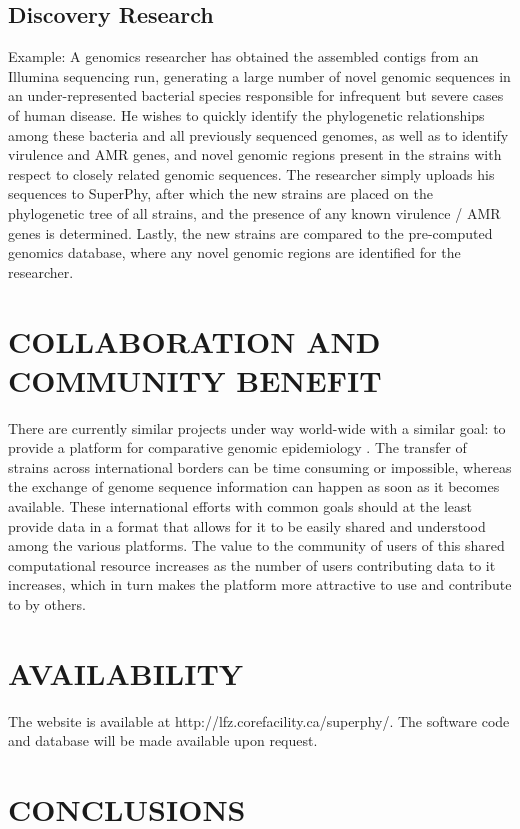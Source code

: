 \documentclass[a4paper,twoside]{article}
\begin{document}
\subsection{Discovery Research}
Example: A genomics researcher has obtained the assembled contigs from an Illumina sequencing run, generating a large number of novel genomic sequences in an under-represented bacterial species responsible for infrequent but severe cases of human disease. He wishes to quickly identify the phylogenetic relationships among these bacteria and all previously sequenced genomes, as well as to identify virulence and AMR genes, and novel genomic regions present in the strains with respect to closely related genomic sequences. The researcher simply uploads his sequences to SuperPhy, after which the new strains are placed on the phylogenetic tree of all strains, and the presence of any known virulence / AMR genes is determined. Lastly, the new strains are compared to the pre-computed genomics database, where any novel genomic regions are identified for the researcher.

\section{\uppercase{Collaboration and Community Benefit}}
\label{sec:collaboration}
There are currently similar projects under way world-wide with a similar goal: to provide a platform for comparative genomic epidemiology \cite{kupferschmidt_outbreak_2011}. The transfer of strains across international borders can be time consuming or impossible, whereas the exchange of genome sequence information can happen as soon as it becomes available. These international efforts with common goals should at the least provide data in a format that allows for it to be easily shared and understood among the various platforms. The value to the community of users of this shared computational resource increases as the number of users contributing data to it increases, which in turn makes the platform more attractive to use and contribute to by others.

\section{\uppercase{Availability}}
\label{sec:availability}

The website is available at http://lfz.corefacility.ca/superphy/. The software code and database will be made available upon request.

\section{\uppercase{Conclusions}}
\label{sec:conclusion}
\end{document}
